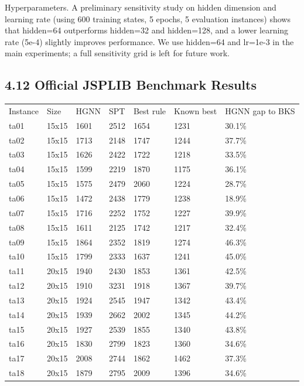 \documentclass{article}
\begin{document}
Hyperparameters. A preliminary sensitivity study on hidden dimension and learning rate (using 600 training states, 5 epochs, 5 evaluation instances) shows that hidden=64 outperforms hidden=32 and hidden=128, and a lower learning rate (5e-4) slightly improves performance. We use hidden=64 and lr=1e-3 in the main experiments; a full sensitivity grid is left for future work.


\subsection*{4.12 Official JSPLIB Benchmark Results}

\begin{table}[h]
\centering
\begin{tabular}{lllllll}
\toprule
Instance & Size & HGNN & SPT & Best rule & Known best & HGNN gap to BKS \\
ta01 & 15x15 & 1601 & 2512 & 1654 & 1231 & 30.1\% \\
ta02 & 15x15 & 1713 & 2148 & 1747 & 1244 & 37.7\% \\
ta03 & 15x15 & 1626 & 2422 & 1722 & 1218 & 33.5\% \\
ta04 & 15x15 & 1599 & 2219 & 1870 & 1175 & 36.1\% \\
ta05 & 15x15 & 1575 & 2479 & 2060 & 1224 & 28.7\% \\
ta06 & 15x15 & 1472 & 2438 & 1779 & 1238 & 18.9\% \\
ta07 & 15x15 & 1716 & 2252 & 1752 & 1227 & 39.9\% \\
ta08 & 15x15 & 1611 & 2125 & 1742 & 1217 & 32.4\% \\
ta09 & 15x15 & 1864 & 2352 & 1819 & 1274 & 46.3\% \\
ta10 & 15x15 & 1799 & 2333 & 1637 & 1241 & 45.0\% \\
ta11 & 20x15 & 1940 & 2430 & 1853 & 1361 & 42.5\% \\
ta12 & 20x15 & 1910 & 3231 & 1918 & 1367 & 39.7\% \\
ta13 & 20x15 & 1924 & 2545 & 1947 & 1342 & 43.4\% \\
ta14 & 20x15 & 1939 & 2662 & 2002 & 1345 & 44.2\% \\
ta15 & 20x15 & 1927 & 2539 & 1855 & 1340 & 43.8\% \\
ta16 & 20x15 & 1830 & 2799 & 1823 & 1360 & 34.6\% \\
ta17 & 20x15 & 2008 & 2744 & 1862 & 1462 & 37.3\% \\
ta18 & 20x15 & 1879 & 2795 & 2009 & 1396 & 34.6\% \\

\end{tabular}
\end{table}
\end{document}
